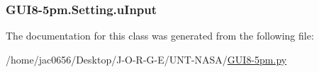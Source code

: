 \subsubsection[{\texorpdfstring{u\+Input}{uInput}}]{\setlength{\rightskip}{0pt plus 5cm}G\+U\+I8-\/5pm.\+Setting.\+u\+Input}\hypertarget{classGUI8-5pm_1_1Setting_a2180e31055e359f24b5fcdce0278dbda}{}\label{classGUI8-5pm_1_1Setting_a2180e31055e359f24b5fcdce0278dbda}


The documentation for this class was generated from the following file\+:\begin{DoxyCompactItemize}
\item 
/home/jac0656/\+Desktop/\+J-\/\+O-\/\+R-\/\+G-\/\+E/\+U\+N\+T-\/\+N\+A\+S\+A/\hyperlink{GUI8-5pm_8py}{G\+U\+I8-\/5pm.\+py}\end{DoxyCompactItemize}
